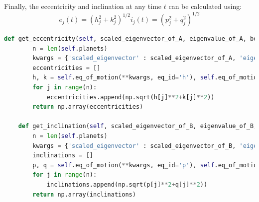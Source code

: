 \documentclass[11pt, oneside]{article}   	%
\begin{document}
Finally, the eccentricity and inclination at any time $t$ can be calculated using:
\begin{subequations}
   \begin{equation}
   e_{j} (t) = \left (h_{j}^{2} + k_{j}^{2} \right)^{1/2}
   \end{equation}
   \begin{equation}
   i_{j} (t) = \left (p_{j}^{2} + q_{j}^{2} \right)^{1/2}
   \end{equation}
\end{subequations}
\begin{lstlisting}[language=Python, caption={Calculating the eccentricity and inclination}, firstnumber=131]
    def get_eccentricity(self, scaled_eigenvector_of_A, eigenvalue_of_A, beta, t):
        n = len(self.planets)
        kwargs = {'scaled_eigenvector' : scaled_eigenvector_of_A, 'eigenvalue' : eigenvalue_of_A, 'phase' : beta, 't' : t}
        eccentricities = []
        h, k = self.eq_of_motion(**kwargs, eq_id='h'), self.eq_of_motion(**kwargs, eq_id='k')
        for j in range(n):  
            eccentricities.append(np.sqrt(h[j]**2+k[j]**2))
        return np.array(eccentricities)

    def get_inclination(self, scaled_eigenvector_of_B, eigenvalue_of_B, gamma, t):
        n = len(self.planets)
        kwargs = {'scaled_eigenvector' : scaled_eigenvector_of_B, 'eigenvalue' : eigenvalue_of_B, 'phase' : gamma, 't' : t}
        inclinations = []
        p, q = self.eq_of_motion(**kwargs, eq_id='p'), self.eq_of_motion(**kwargs, eq_id='q')
        for j in range(n):
            inclinations.append(np.sqrt(p[j]**2+q[j]**2))
        return np.array(inclinations)
\end{lstlisting}
\end{document}
